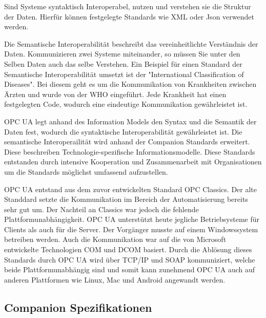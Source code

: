 \documentclass[a4paper, 12pt, oneside]{scrbook}
\begin{document}
	Sind Systeme syntaktisch Interoperabel, nutzen und verstehen sie die Struktur der Daten. Hierfür können festgelegte Standards wie XML oder Json verwendet werden. 
	
	Die Semantische Interoperabilität beschreibt das vereinheitlichte Verständnis der Daten. Kommunizieren zwei Systeme miteinander, so müssen Sie unter den Selben Daten auch das selbe Verstehen. Ein Beispiel für einen Standard der Semantische Interoperabilität umsetzt ist der "International Classification of Diseases". Bei diesem geht es um die Kommunikation von Krankheiten zwischen Ärzten und wurde von der WHO eingeführt. Jede Krankheit hat einen festgelegten Code, wodurch eine eindeutige Kommunikation gewährleistet ist.
	
	OPC UA legt anhand des Information Models den Syntax und die Semantik der Daten fest, wodurch die syntaktische Interoperabilität gewährleistet ist. Die semantische Interoperailität wird anhand der Companion Standards erweitert. Diese beschreiben Technologie-spezifische Informationsmodelle. Diese Standards entstanden durch intensive Kooperation und Zusammenarbeit mit Organisationen um die Standards möglichst umfassend aufzustellen. %
	
	OPC UA entstand aus dem zuvor entwickelten Standard OPC Classics. Der alte Standdard setzte die Kommunikation im Bereich der Automatisierung bereits sehr gut um. Der Nachteil an Classics war jedoch die fehlende Plattformunabhängigkeit. OPC UA unterstützt heute jegliche Betriebsysteme für Clients als auch für die Server. Der Vorgänger musste auf einem Windowssystem betreiben werden. Auch die Kommunikation war auf die von Microsoft entwickelte Technologien \ac{COM} und \ac{DCOM} basiert. Durch die Ablösung dieses Standards durch OPC UA wird über TCP/IP und SOAP kommuniziert, welche beide Plattformunabhängig sind und somit kann zunehmend OPC UA auch auf anderen Plattformen wie Linux, Mac und Android angewandt werden.
	
		\subsection{Companion Spezifikationen}
		
		
		
\end{document}
